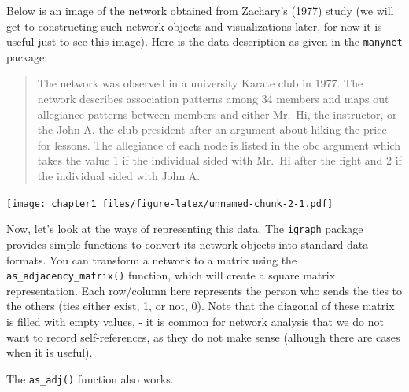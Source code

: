 \documentclass[
]{book}
\begin{document}
Below is an image of the network obtained from Zachary's (1977) study (we will get to constructing such network objects and visualizations later, for now it is useful just to see this image). Here is the data description as given in the \texttt{manynet} package:

\begin{quote}
The network was observed in a university Karate club in 1977. The network describes association patterns among 34 members and maps out allegiance patterns between members and either Mr.~Hi, the instructor, or the John A. the club president after an argument about hiking the price for lessons. The allegiance of each node is listed in the obc argument which takes the value 1 if the individual sided with Mr.~Hi after the fight and 2 if the individual sided with John A.
\end{quote}

\texttt{[image: chapter1\_files/figure-latex/unnamed-chunk-2-1.pdf]}

Now, let's look at the ways of representing this data. The \texttt{igraph} package provides simple functions to convert its network objects into standard data formats. You can transform a network to a matrix using the \texttt{as\_adjacency\_matrix()} function, which will create a square matrix representation. Each row/column here represents the person who sends the ties to the others (ties either exist, 1, or not, 0). Note that the diagonal of these matrix is filled with empty values, - it is common for network analysis that we do not want to record self-references, as they do not make sense (alhough there are cases when it is useful).

The \texttt{as\_adj()} function also works.
\end{document}
